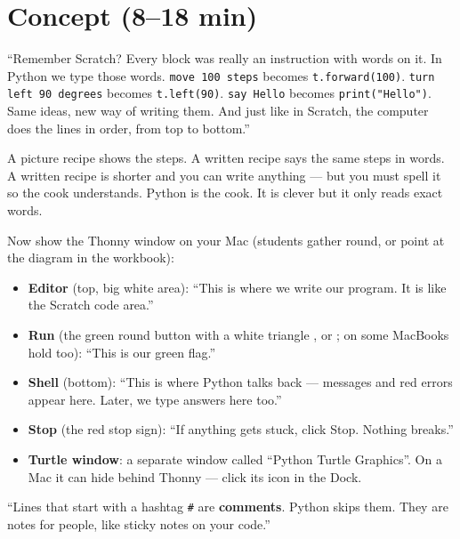 \section{Concept (8--18 min)}
\begin{teacherscript}
\enquote{Remember Scratch? Every block was really an instruction with words on it. In Python we type those words. \texttt{move 100 steps} becomes \texttt{t.forward(100)}. \texttt{turn left 90 degrees} becomes \texttt{t.left(90)}. \texttt{say Hello} becomes \texttt{print("Hello")}. Same ideas, new way of writing them. And just like in Scratch, the computer does the lines in order, from top to bottom.}
\end{teacherscript}
\begin{analogy}
A picture recipe shows the steps. A written recipe says the same steps in words. A written recipe is shorter and you can write anything --- but you must spell it so the cook understands. Python is the cook. It is clever but it only reads exact words.
\end{analogy}
Now show the Thonny window on your Mac (students gather round, or point at the diagram in the workbook):
\begin{itemize}[leftmargin=1.2em,itemsep=1pt]
  \item \textbf{Editor} (top, big white area): \enquote{This is where we write our program. It is like the Scratch code area.}
  \item \textbf{Run} (the green round button with a white triangle \faPlayCircle, or ; on some MacBooks hold  too): \enquote{This is our green flag.}
  \item \textbf{Shell} (bottom): \enquote{This is where Python talks back --- messages and red errors appear here. Later, we type answers here too.}
  \item \textbf{Stop} (the red stop sign): \enquote{If anything gets stuck, click Stop. Nothing breaks.}
  \item \textbf{Turtle window}: a separate window called \enquote{Python Turtle Graphics}. On a Mac it can hide behind Thonny --- click its icon in the Dock.
\end{itemize}
\begin{teacherscript}
\enquote{Lines that start with a hashtag \texttt{\#} are \textbf{comments}. Python skips them. They are notes for people, like sticky notes on your code.}
\end{teacherscript}

